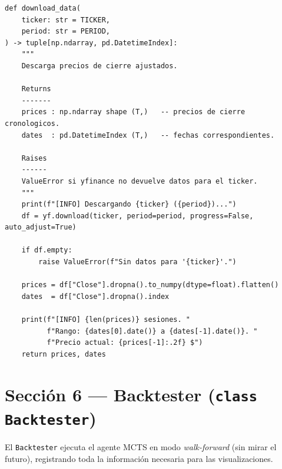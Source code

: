 \documentclass[12pt, a4paper]{article}
\begin{document}
\begin{lstlisting}[caption={Descarga de precios con yfinance}]
def download_data(
    ticker: str = TICKER,
    period: str = PERIOD,
) -> tuple[np.ndarray, pd.DatetimeIndex]:
    """
    Descarga precios de cierre ajustados.

    Returns
    -------
    prices : np.ndarray shape (T,)   -- precios de cierre cronologicos.
    dates  : pd.DatetimeIndex (T,)   -- fechas correspondientes.

    Raises
    ------
    ValueError si yfinance no devuelve datos para el ticker.
    """
    print(f"[INFO] Descargando {ticker} ({period})...")
    df = yf.download(ticker, period=period, progress=False, auto_adjust=True)

    if df.empty:
        raise ValueError(f"Sin datos para '{ticker}'.")

    prices = df["Close"].dropna().to_numpy(dtype=float).flatten()
    dates  = df["Close"].dropna().index

    print(f"[INFO] {len(prices)} sesiones. "
          f"Rango: {dates[0].date()} a {dates[-1].date()}. "
          f"Precio actual: {prices[-1]:.2f} $")
    return prices, dates
\end{lstlisting}

\section{Sección 6 --- Backtester (\texttt{class Backtester})}

El \texttt{Backtester} ejecuta el agente MCTS en modo \emph{walk-forward}
(sin mirar el futuro), registrando toda la información necesaria para las
visualizaciones.
\end{document}
